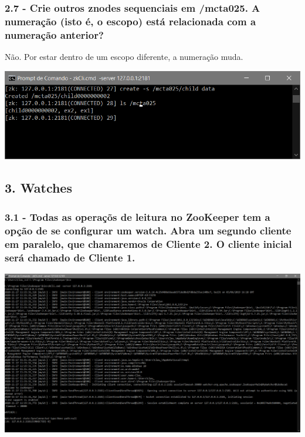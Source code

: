 \subsubsection{2.7 - Crie outros znodes sequenciais em /mcta025. A numeração (isto é, o escopo) está relacionada com a numeração anterior?}
Não. Por estar dentro de um escopo diferente, a numeração muda.
\newline

\includegraphics{pratica3/prints/roteiro 2.7.PNG}


\subsection*{3. Watches}

\subsubsection{3.1 - Todas as operaçõs de leitura no ZooKeeper tem a opção de se
configurar um watch. Abra um segundo cliente em paralelo, que
chamaremos de Cliente 2. O cliente inicial será chamado de Cliente 1.}

\includegraphics[width=20cm]{pratica3/prints/client2_started.PNG}

